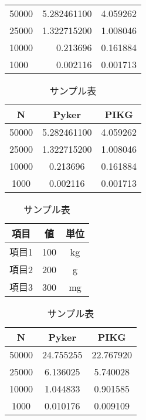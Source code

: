 \documentclass{article}
\begin{document}
\begin{tabular}{|l|r|r|} \hline
  50000 & 5.282461100 & 4.059262 \\
  25000 & 1.322715200 & 1.008046 \\
  10000 & 0.213696 & 0.161884 \\
  1000 & 0.002116 & 0.001713 \\
 \end{tabular}

\begin{table}
  \centering %
  \caption{サンプル表} %
  \label{tab:sampleTable1}
  \begin{tabular}{ccc} %
  \toprule
  N & Pyker & PIKG \\
  \midrule
  50000 & 5.282461100 & 4.059262 \\
  25000 & 1.322715200 & 1.008046 \\
  10000 & 0.213696 & 0.161884 \\
  1000 & 0.002116 & 0.001713 \\
\bottomrule
\end{tabular}
\end{table}
\begin{table}[ht]
  \centering %
  \caption{サンプル表} %
  \label{tab:sampleTable2}
  \begin{tabular}{ccc} %
  \toprule
  項目 & 値 & 単位 \\
  \midrule
  項目1 & 100 & kg \\
  項目2 & 200 & g \\
  項目3 & 300 & mg \\
\bottomrule
\end{tabular}
\end{table}


\begin{table}[ht]
  \centering %
  \caption{サンプル表} %
  \label{tab:sampleTable3}
  \begin{tabular}{ccc} %
  \toprule
  N & Pyker & PIKG \\
  \midrule
  50000 & 24.755255 & 22.767920 \\
  25000 & 6.136025 & 5.740028 \\
  10000 & 1.044833 & 0.901585\\
  1000 & 0.010176 & 0.009109 \\
\bottomrule
\end{tabular}
\end{table}
\end{document}
